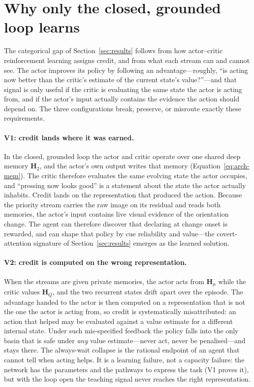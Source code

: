\section{Why only the closed, grounded loop learns}
\label{sec:mechanism}

The categorical gap of Section~\ref{sec:results} follows from how actor--critic reinforcement learning assigns credit, and from what each stream can and cannot see. The actor improves its policy by following an advantage---roughly, ``is acting now better than the critic's estimate of the current state's value?''---and that signal is only useful if the critic is evaluating the same state the actor is acting from, and if the actor's input actually contains the evidence the action should depend on. The three configurations break, preserve, or misroute exactly these requirements.

\paragraph{V1: credit lands where it was earned.} In the closed, grounded loop the actor and critic operate over one shared deep memory $\mathbf{H}_2$, and the actor's own output writes that memory (Equation~\eqref{eq:arch-mem}). The critic therefore evaluates the same evolving state the actor occupies, and ``pressing now looks good'' is a statement about the state the actor actually inhabits. Credit lands on the representation that produced the action. Because the priority stream carries the raw image on its residual and reads both memories, the actor's input contains live visual evidence of the orientation change. The agent can therefore discover that declaring at change onset is rewarded, and can shape that policy by cue reliability and value---the covert-attention signature of Section~\ref{sec:results} emerges as the learned solution.

\paragraph{V2: credit is computed on the wrong representation.} When the streams are given private memories, the actor acts from $\mathbf{H}_{\mu}$ while the critic values $\mathbf{H}_{Q}$, and the two recurrent states drift apart over the episode. The advantage handed to the actor is then computed on a representation that is not the one the actor is acting from, so credit is systematically misattributed: an action that helped may be evaluated against a value estimate for a different internal state. Under such mis-specified feedback the policy falls into the only basin that is safe under \emph{any} value estimate---never act, never be penalised---and stays there. The always-wait collapse is the rational endpoint of an agent that cannot tell when acting helps. It is a learning failure, not a capacity failure: the network has the parameters and the pathways to express the task (V1 proves it), but with the loop open the teaching signal never reaches the right representation.

